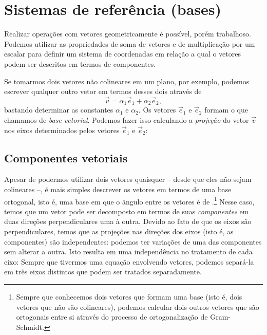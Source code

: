 \section{Sistemas de referência (bases)} 

Realizar operações com vetores geometricamente é possível, porém trabalhoso. Podemos utilizar as propriedades de soma de vetores e de multiplicação por um escalar para definir um sistema de coordenadas em relação a qual o vetores podem ser descritos em termos de componentes.

Se tomarmos dois vetores não colineares em um plano, por exemplo, podemos escrever qualquer outro vetor em termos desses dois através de
\begin{equation}
  \vec{v} = \alpha_1 \vec{e}_1 + \alpha_2 \vec{e}_2,
\end{equation}
%
bastando determinar as constantes $\alpha_1$ e $\alpha_2$. Os vetores $\vec{e}_1$ e $\vec{e}_2$ formam o que chamamos de \emph{base vetorial}. Podemos fazer isso calculando a \emph{projeção} do vetor $\vec{v}$ nos eixos determinados pelos vetores $\vec{e}_1$ e $\vec{e}_2$: 


\subsection{Componentes vetoriais}\label{Sec:ComponentesVetoriais}

\noindent{}Apesar de podermos utilizar dois vetores quaisquer -- desde que eles não sejam colineares --, é mais simples descrever os vetores em termos de uma base ortogonal, isto é, uma base em que o ângulo entre os vetores é de .\footnote{Sempre que conhecemos dois vetores que formam uma base (isto é, dois vetores que não são colineares), podemos calcular dois outros vetores que são ortogonais entre si através do processo de ortogonalização de Gram-Schmidt.} Nesse caso, temos que um vetor pode ser decomposto em termos de suas \emph{componentes} em duas direções perpendiculares uma à outra. Devido ao fato de que os eixos são perpendiculares, temos que as projeções nas direções dos eixos (isto é, as componentes) são independentes: podemos ter variações de uma das componentes sem alterar a outra. Isto resulta em uma independência no tratamento de cada eixo: Sempre que tivermos uma equação envolvendo vetores, podemos separá-la em três eixos distintos que podem ser tratados separadamente. 

